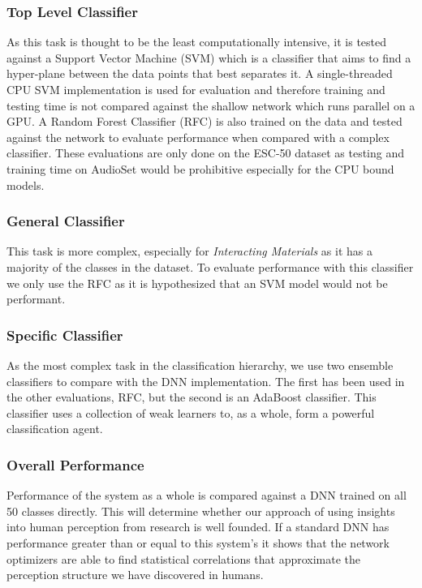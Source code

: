 \subsubsection{Top Level Classifier}
As this task is thought to be the least computationally intensive, it is tested against a Support Vector Machine (SVM) which is a classifier that aims to find a hyper-plane between the data points that best separates it. A single-threaded CPU SVM implementation is used for evaluation and therefore training and testing time is not compared against the shallow network which runs parallel on a GPU. A Random Forest Classifier (RFC) is also trained on the data and tested against the network to evaluate performance when compared with a complex classifier. These evaluations are only done on the ESC-50 dataset as testing and training time on AudioSet would be prohibitive especially for the CPU bound models.

\subsubsection{General Classifier}
This task is more complex, especially for \textit{Interacting Materials} as it has a majority of the classes in the dataset. To evaluate performance with this classifier we only use the RFC as it is hypothesized that an SVM model would not be performant.

\subsubsection{Specific Classifier}
As the most complex task in the classification hierarchy, we use two ensemble classifiers to compare with the DNN implementation. The first has been used in the other evaluations, RFC, but the second is an AdaBoost classifier. This classifier uses a collection of weak learners to, as a whole, form a powerful classification agent.

\subsubsection{Overall Performance}
Performance of the system as a whole is compared against a DNN trained on all 50 classes directly. This will determine whether our approach of using insights into human perception from research is well founded. If a standard DNN has performance greater than or equal to this system's it shows that the network optimizers are able to find statistical correlations that approximate the perception structure we have discovered in humans. 

